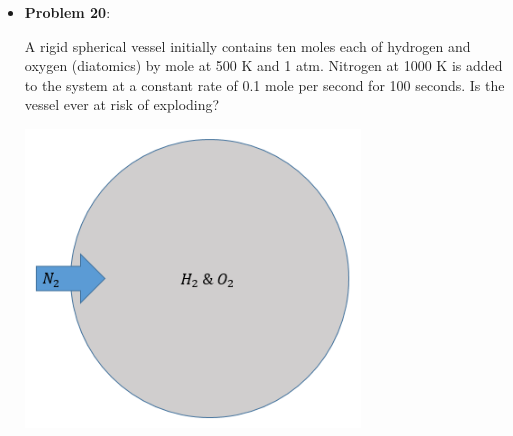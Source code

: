 \documentclass[11pt]{article}
\newcommand{\Item}[1]{\item \textbf{#1}:}
\newcommand{\Problem}[1]{\Item{Problem #1}}
\begin{document}
\begin{itemize}
\newpage
\Problem{20}\\
\begin{minipage}{0.48\textwidth}
A rigid spherical vessel initially contains ten moles each of hydrogen and oxygen (diatomics) by mole at 500 K and 1 atm. Nitrogen at 1000 K is added to the system at a constant rate of 0.1 mole per second for 100 seconds. Is the vessel ever at risk of exploding?
\end{minipage}
\begin{minipage}{0.48\textwidth}
\centering
\includegraphics[width=0.7\textwidth]{Graphics/spherical_H2-O2.PNG}
\end{minipage}




\end{itemize}
\end{document}
